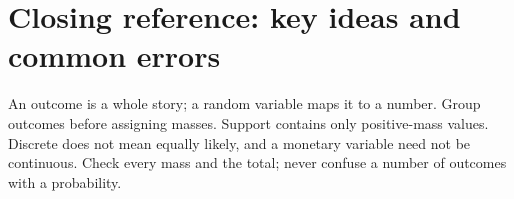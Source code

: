 \section{Closing reference: key ideas and common errors}


\label{subsec:t2-c1-key-ideas-and-common-errors}
An outcome is a whole story; a random variable maps it to a number. Group outcomes before assigning masses. Support contains only positive-mass values. Discrete does not mean equally likely, and a monetary variable need not be continuous. Check every mass and the total; never confuse a number of outcomes with a probability.
\secInicio


